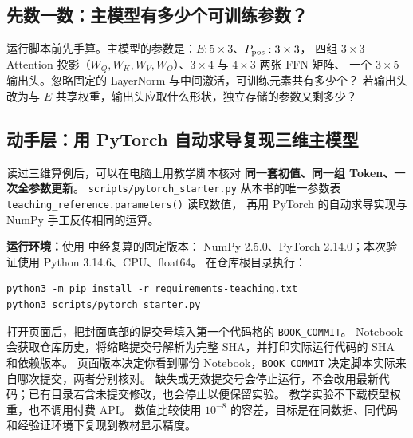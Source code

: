\subsection{先数一数：主模型有多少个可训练参数？}
\label{app:parameter-count}

运行脚本前先手算。主模型的参数是：$E:5\times3$、$P_{\rm pos}:3\times3$，
四组 $3\times3$ Attention 投影（$W_Q,W_K,W_V,W_O$）、$3\times4$ 与 $4\times3$ 两张 FFN 矩阵、
一个 $3\times5$ 输出头。忽略固定的 LayerNorm 与中间激活，可训练元素共有多少个？
若输出头改为与 $E$ 共享权重，输出头应取什么形状，独立存储的参数又剩多少？

\par

\subsection{动手层：用 PyTorch 自动求导复现三维主模型}
\label{app:pytorch-lab}

读过三维算例后，可以在电脑上用教学脚本核对
\textbf{同一套初值、同一组 Token、一次全参数更新}。
\texttt{scripts/pytorch\_starter.py} 从本书的唯一参数表
\texttt{teaching\_reference.parameters()} 读取数值，
再用 PyTorch 的自动求导实现与 NumPy 手工反传相同的运算。

\textbf{运行环境：}使用  中经复算的固定版本：
NumPy 2.5.0、PyTorch 2.14.0；本次验证使用 Python 3.14.6、CPU、float64。
在仓库根目录执行：
\begin{verbatim}
python3 -m pip install -r requirements-teaching.txt
python3 scripts/pytorch_starter.py
\end{verbatim}
\noindent 打开页面后，把封面底部的提交号填入第一个代码格的 \texttt{BOOK\_COMMIT}。
Notebook 会获取仓库历史，将缩略提交号解析为完整 SHA，并打印实际运行代码的 SHA 和依赖版本。
页面版本决定你看到哪份 Notebook，\texttt{BOOK\_COMMIT} 决定脚本实际来自哪次提交，两者分别核对。
缺失或无效提交号会停止运行，不会改用最新代码；已有目录若含未提交修改，也会停止以便保留实验。
教学实验不下载模型权重，也不调用付费 API。
数值比较使用 $10^{-8}$ 的容差，目标是在同数据、同代码和经验证环境下复现到教材显示精度。

